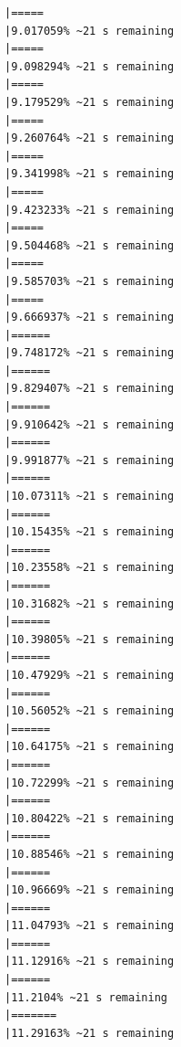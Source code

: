 \documentclass{article}\usepackage[]{graphicx}\usepackage[]{xcolor}
\makeatletter
\newenvironment{kframe}{%
 \def\at@end@of@kframe{}%
 \ifinner\ifhmode%
  \def\at@end@of@kframe{\end{minipage}}%
  \begin{minipage}{\columnwidth}%
 \fi\fi%
 \def\FrameCommand##1{\hskip\@totalleftmargin \hskip-\fboxsep
 \colorbox{shadecolor}{##1}\hskip-\fboxsep
     \hskip-\linewidth \hskip-\@totalleftmargin \hskip\columnwidth}%
 \MakeFramed {\advance\hsize-\width
   \@totalleftmargin\z@ \linewidth\hsize
   \@setminipage}}%
 {\par\unskip\endMakeFramed%
 \at@end@of@kframe}
\newenvironment{knitrout}{}{} %
\makeatother
\begin{document}
\begin{knitrout}
\begin{kframe}
\begin{verbatim}
|=====                                                         |9.017059% ~21 s remaining 
|=====                                                         |9.098294% ~21 s remaining 
|=====                                                         |9.179529% ~21 s remaining 
|=====                                                         |9.260764% ~21 s remaining 
|=====                                                         |9.341998% ~21 s remaining 
|=====                                                         |9.423233% ~21 s remaining 
|=====                                                         |9.504468% ~21 s remaining 
|=====                                                         |9.585703% ~21 s remaining 
|=====                                                         |9.666937% ~21 s remaining 
|======                                                        |9.748172% ~21 s remaining 
|======                                                        |9.829407% ~21 s remaining 
|======                                                        |9.910642% ~21 s remaining 
|======                                                        |9.991877% ~21 s remaining 
|======                                                        |10.07311% ~21 s remaining 
|======                                                        |10.15435% ~21 s remaining 
|======                                                        |10.23558% ~21 s remaining 
|======                                                        |10.31682% ~21 s remaining 
|======                                                        |10.39805% ~21 s remaining 
|======                                                        |10.47929% ~21 s remaining 
|======                                                        |10.56052% ~21 s remaining 
|======                                                        |10.64175% ~21 s remaining 
|======                                                        |10.72299% ~21 s remaining 
|======                                                        |10.80422% ~21 s remaining 
|======                                                        |10.88546% ~21 s remaining 
|======                                                        |10.96669% ~21 s remaining 
|======                                                        |11.04793% ~21 s remaining 
|======                                                        |11.12916% ~21 s remaining 
|======                                                        |11.2104% ~21 s remaining  
|=======                                                       |11.29163% ~21 s remaining 

\end{verbatim}
\end{kframe}
\end{knitrout}
\end{document}
